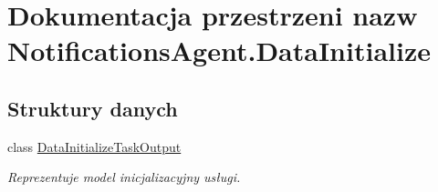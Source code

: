 \hypertarget{a00297}{}\section{Dokumentacja przestrzeni nazw Notifications\+Agent.\+Data\+Initialize}
\label{a00297}
\subsection*{Struktury danych}
\begin{DoxyCompactItemize}
\item 
class \hyperlink{a00016}{Data\+Initialize\+Task\+Output}
\begin{DoxyCompactList}\small\item\em Reprezentuje model inicjalizacyjny usługi. \end{DoxyCompactList}\end{DoxyCompactItemize}
